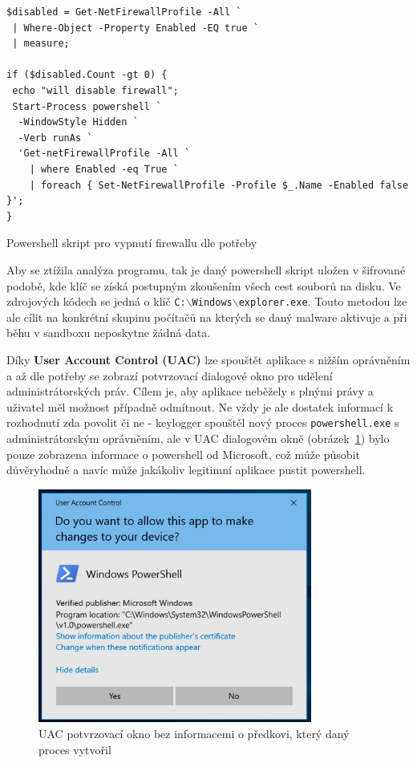 \documentclass[12pt,a4paper]{article}
\begin{document}
\begin{listing}
	\begin{verbatim}
$disabled = Get-NetFirewallProfile -All `
 | Where-Object -Property Enabled -EQ true `
 | measure;

if ($disabled.Count -gt 0) {
 echo "will disable firewall";
 Start-Process powershell `
  -WindowStyle Hidden `
  -Verb runAs `
  'Get-netFirewallProfile -All `
    | where Enabled -eq True `
    | foreach { Set-NetFirewallProfile -Profile $_.Name -Enabled false }';
}
	\end{verbatim}
	\caption{Powershell skript pro vypnutí firewallu dle potřeby}
	\label{lst:disable_fw}
\end{listing}


Aby se ztížila analýza programu, tak je daný powershell skript uložen v šifrované podobě, kde klíč se získá postupným zkoušením všech cest souborů na disku.
Ve zdrojových kódech se jedná o klíč \texttt{C:$\backslash$Windows$\backslash$explorer.exe}.
Touto metodou lze ale cílit na konkrétní skupinu počítačů na kterých se daný malware aktivuje a při běhu v sandboxu neposkytne žádná data.

Díky \textbf{User Account Control (UAC)} lze spouštět aplikace s nižším oprávněním a až dle potřeby se zobrazí potvrzovací dialogové okno pro udělení administrátorských práv.
Cílem je, aby aplikace neběžely s plnými právy a uživatel měl možnost případně odmítnout.
Ne vždy je ale dostatek informací k rozhodnutí zda povolit či ne - keylogger spouštěl nový proces \texttt{powershell.exe} s administrátorským oprávněním, ale v UAC dialogovém okně (obrázek~\ref{fig:uac}) bylo pouze zobrazena informace o powershell od Microsoft, což může působit důvěryhodně a navíc může jakákoliv legitimní aplikace pustit powershell.

\begin{figure}[ht]
	\centering
	\includegraphics[width=9cm]{uac_powershell}
	\caption{UAC potvrzovací okno bez informacemi o předkovi, který daný proces vytvořil}
	\label{fig:uac}
\end{figure}
\end{document}
